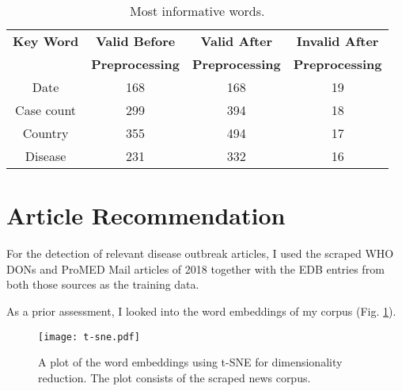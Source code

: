 \begin{table}
  \centering
  \caption{Most informative words.}
  \begin{tabular}{@{}cccc@{}}
    \toprule
    \textbf{Key Word} & \textbf{Valid Before} & \textbf{Valid After} & \textbf{Invalid After} \\
    & \textbf{Preprocessing} & \textbf{Preprocessing} & \textbf{Preprocessing} \\
    \midrule
    Date & 168 & 168 &  19 \\
    Case count & 299 & 394 &  18 \\
    Country & 355 & 494 &  17 \\
    Disease & 231 & 332 & 16 \\
    \bottomrule
  \end{tabular}
  \label{table:preprocessing performance}
\end{table}


\section{Article Recommendation}
For the detection of relevant disease outbreak articles, I used the scraped WHO DONs and ProMED Mail articles of 2018 together with the EDB entries from both those sources as the training data.

As a prior assessment, I looked into the word embeddings of my corpus (Fig. \ref{fig:t-sne}).

\begin{figure}[h!]
    \centering
    \texttt{[image: t-sne.pdf]}
    \caption{A plot of the word embeddings using t-SNE for dimensionality reduction. The plot consists of the scraped news corpus.}
    \label{fig:t-sne}
\end{figure}

